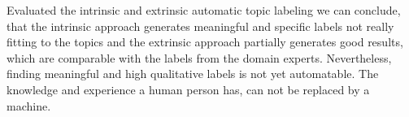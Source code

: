 {Evaluated the intrinsic and extrinsic automatic topic labeling we can conclude, that the intrinsic approach generates meaningful and specific labels not really fitting to the topics and the extrinsic approach partially generates good results, which are comparable with the labels from the domain experts. Nevertheless, finding meaningful and high qualitative labels is not yet automatable. The knowledge and experience a human person has, can not be replaced by a machine.
}
